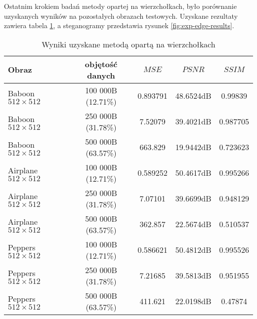 {{{            %
            Ostatnim krokiem badań metody opartej na wierzchołkach, było porównanie uzyskanych wyników na pozostałych
            obrazach testowych. Uzyskane rezultaty zawiera tabela \ref{tab:exp-edge-results}, a steganogramy przedstawia
            rysunek \ref{fig:exp-edge-results}.

            \begin{table}
                \centering
                \caption{Wyniki uzyskane metodą opartą na wierzchołkach}
                \begin{tabular}{ |l|c|c c c| }
                    \hline
                    Obraz & objętość danych & $MSE$ & $PSNR$ & $SSIM$ \\
                    \hline
                    Baboon {\footnotesize $512 \times 512$}   & 100 000B (12.71\%) & 0.893791 & 48.6524dB & 0.99839 \\
                    Baboon {\footnotesize $512 \times 512$}   & 250 000B (31.78\%) & 7.52079 & 39.4021dB & 0.987705 \\
                    Baboon {\footnotesize $512 \times 512$}   & 500 000B (63.57\%) & 663.829 & 19.9442dB & 0.723623 \\
                    Airplane {\footnotesize $512 \times 512$} & 100 000B (12.71\%) & 0.589252 & 50.4617dB & 0.995266 \\
                    Airplane {\footnotesize $512 \times 512$} & 250 000B (31.78\%) & 7.07101 & 39.6699dB & 0.948129 \\
                    Airplane {\footnotesize $512 \times 512$} & 500 000B (63.57\%) & 362.857 & 22.5674dB & 0.510537 \\
                    Peppers {\footnotesize $512 \times 512$}  & 100 000B (12.71\%) & 0.586621 & 50.4812dB & 0.995526 \\
                    Peppers {\footnotesize $512 \times 512$}  & 250 000B (31.78\%) & 7.21685 & 39.5813dB & 0.951955 \\
                    Peppers {\footnotesize $512 \times 512$}  & 500 000B (63.57\%) & 411.621 & 22.0198dB & 0.47874 \\
                    \hline
                \end{tabular}
                \label{tab:exp-edge-results}
            \end{table}

}}}
